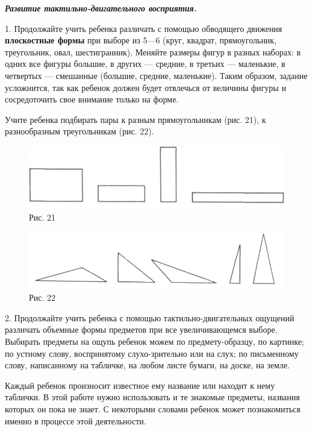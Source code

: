 \documentclass{book}
\renewcommand{\emph}[1]{\textit{#1}}
\begin{document}
\emph{\textbf{Развитие тактильно-двигательного восприятия.}}

1. Продолжайте учить ребенка различать с помощью обводящего движения
\textbf{плоскостные формы} при выборе из 5---6 (круг, квадрат,
прямоугольник, треугольник, овал, шестигранник). Меняйте размеры фигур в
разных наборах: в одних все фигуры большие, в других --- средние, в
третьих --- маленькие, в четвертых --- смешанные (большие, средние,
маленькие). Таким образом, задание усложнится, так как ребенок должен
будет отвлечься от величины фигуры и сосредоточить свое внимание только
на форме.

Учите ребенка подбирать пары к разным прямоугольникам (рис. 21), к
разнообразным треугольникам (рис. 22).

\begin{figure}
\centering
\includegraphics[width=\linewidth]{media/media/image18.png}
\caption*{Рис. 21}
\end{figure}


\begin{figure}
\centering
\includegraphics[width=\linewidth]{media/media/image19.png}
\caption*{Рис. 22}
\end{figure}


2. Продолжайте учить ребенка с помощью тактильно-двигательных ощущений
различать объемные формы предметов при все увеличивающемся выборе.
Выбирать предметы на ощупь ребенок можем по предмету-образцу, по
картинке; по устному слову, воспринятому слухо-зрительно или на слух; по
письменному слову, написанному на табличке, на любом листе бумаги, на
доске, на земле.

Каждый ребенок произносит известное ему название или находит к нему
таблички. В этой работе нужно использовать и те знакомые предметы,
названия которых он пока не знает. С некоторыми словами ребенок может
познакомиться именно в процессе этой деятельности.
\end{document}

